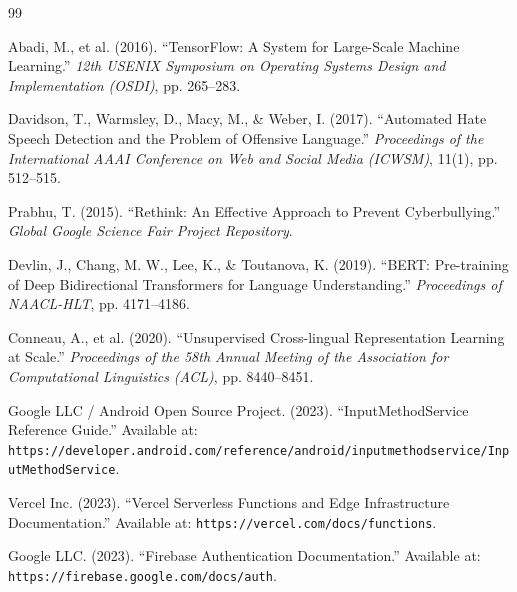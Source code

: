 \documentclass[A4paper,12pt]{report}
\theoremstyle{plain}
\theoremstyle{definition}
\theoremstyle{remark}
\numberwithin{equation}{section}
\renewenvironment{thebibliography}[1]{
  \begin{oldthebibliography}{#1}
    \setlength{\itemsep}{0em}
}
{
  \end{oldthebibliography}
}
\begin{document}
\begin{thebibliography}{99}
Abadi, M., et al. (2016). ``TensorFlow: A System for Large-Scale Machine Learning.'' \textit{12th USENIX Symposium on Operating Systems Design and Implementation (OSDI)}, pp. 265--283.

Davidson, T., Warmsley, D., Macy, M., \& Weber, I. (2017). ``Automated Hate Speech Detection and the Problem of Offensive Language.'' \textit{Proceedings of the International AAAI Conference on Web and Social Media (ICWSM)}, 11(1), pp. 512--515.

Prabhu, T. (2015). ``Rethink: An Effective Approach to Prevent Cyberbullying.'' \textit{Global Google Science Fair Project Repository}.

Devlin, J., Chang, M. W., Lee, K., \& Toutanova, K. (2019). ``BERT: Pre-training of Deep Bidirectional Transformers for Language Understanding.'' \textit{Proceedings of NAACL-HLT}, pp. 4171--4186.

Conneau, A., et al. (2020). ``Unsupervised Cross-lingual Representation Learning at Scale.'' \textit{Proceedings of the 58th Annual Meeting of the Association for Computational Linguistics (ACL)}, pp. 8440--8451.

Google LLC / Android Open Source Project. (2023). ``InputMethodService Reference Guide.'' Available at: \texttt{https://developer.android.com/reference/android/inputmethodservice/InputMethodService}.

Vercel Inc. (2023). ``Vercel Serverless Functions and Edge Infrastructure Documentation.'' Available at: \texttt{https://vercel.com/docs/functions}.

Google LLC. (2023). ``Firebase Authentication Documentation.'' Available at: \texttt{https://firebase.google.com/docs/auth}.

\end{thebibliography}
\end{document}
